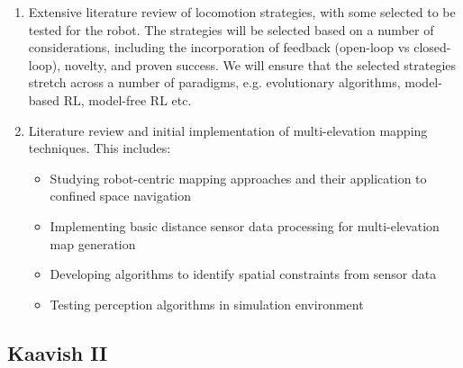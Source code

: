 \begin{enumerate}
\begin{itemize}
        \item Identifying the parameters for the lava tubes terrain and scaling them down appropriately. 
        \item Making a simulation environment for testing. This can be handcrafted based on the parameters identified, but procedural random generation will allow for the robot to be extensively tested in simulation with better generalization and there is some recent work that suggests this could be possible \cite{garciaPLUMEProceduralLayer2025}
    \end{itemize}
    \item Extensive literature review of locomotion strategies, with some selected to be tested for the robot. The strategies will be selected based on a number of considerations, including the incorporation of feedback (open-loop vs closed-loop), novelty, and proven success. We will ensure that the selected strategies stretch across a number of paradigms, e.g. evolutionary algorithms, model-based RL, model-free RL etc.
    \item Literature review and initial implementation of multi-elevation mapping techniques. This includes:
\begin{itemize}
    \item Studying robot-centric mapping approaches and their application to confined space navigation \cite{buchananWalkingPostureAdaptation2019, mikiLearningRobustPerceptive2022}
    \item Implementing basic distance sensor data processing for multi-elevation map generation
    \item Developing algorithms to identify spatial constraints from sensor data
    \item Testing perception algorithms in simulation environment
\end{itemize}
\end{enumerate}

\subsection{Kaavish II}

